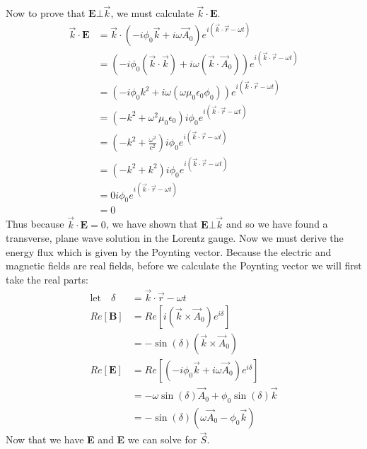 \documentclass[a4paper, 11pt]{article}
\begin{document}
Now to prove that $\mathbf{E} \bot \vec{k}$, we must calculate $\vec{k}\cdot\mathbf{E}$. 
	\begin{align*}
		\vec{k}\cdot\mathbf{E} &= \vec{k}\cdot(-i\phi_0\vec{k}+i\omega\vec{A}_0)e^{i(\vec{k}\cdot\vec{r}-\omega t)}\\
		&=(-i\phi_0(\vec{k}\cdot\vec{k})+i\omega(\vec{k}\cdot\vec{A}_0))e^{i(\vec{k}\cdot\vec{r}-\omega t)}\\
		&=(-i\phi_0k^2+i\omega(\omega\mu_0\epsilon_0\phi_0))e^{i(\vec{k}\cdot\vec{r}-\omega t)}\\
		&=(-k^2+\omega^2\mu_0\epsilon_0)i\phi_0e^{i(\vec{k}\cdot\vec{r}-\omega t)}\\
		&=(-k^2+\frac{\omega^2}{c^2})i\phi_0e^{i(\vec{k}\cdot\vec{r}-\omega t)}\\ 
		&=(-k^2+k^2)i\phi_0e^{i(\vec{k}\cdot\vec{r}-\omega t)}\\ 
		&=0i\phi_0e^{i(\vec{k}\cdot\vec{r}-\omega t)}\\ 
		&=0
	\end{align*}
Thus because $\vec{k}\cdot\mathbf{E} =0$, we have shown that $\mathbf{E}\bot\vec{k}$ and so we have found a transverse, plane wave solution in the Lorentz gauge. Now we must derive the energy flux which is given by the Poynting vector. Because the electric and magnetic fields are real fields, before we calculate the Poynting vector we will first take the real parts: 
	\begin{align*}
		\text{let} \quad \delta &= \vec{k}\cdot\vec{r}-\omega t \\ 
		Re[\mathbf{B}]	&= Re[i(\vec{k}\times\vec{A}_0)e^{i\delta}] \\ 
						&= -\sin(\delta)(\vec{k}\times\vec{A}_0) \\ 
		Re[\mathbf{E}]	&= Re[(-i\phi_0\vec{k}+i\omega\vec{A}_0)e^{i\delta}] \\ 
						&=-\omega \sin(\delta) \vec{A}_0 + \phi_0\sin(\delta)\vec{k} \\ 
						&= -\sin(\delta)(\omega \vec{A}_0 - \phi_0\vec{k})	
	\end{align*}
Now that we have \textbf{E} and \textbf{E} we can solve for $\vec{S}$. 
\end{document}
